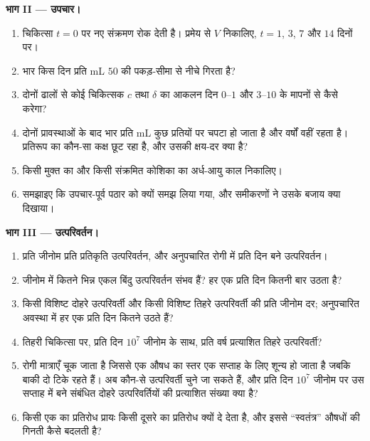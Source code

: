 \begin{problem}
\medskip
\noindent\textbf{भाग II --- उपचार।}
\begin{enumerate}[resume]
  \item चिकित्सा $t = 0$ पर नए संक्रमण रोक देती है। प्रमेय से $V$ निकालिए, $t =
        1$, $3$, $7$ और $14$ दिनों पर।
  \item भार किस दिन प्रति mL $50$ की पकड़-सीमा से नीचे गिरता है?
  \item दोनों ढालों से कोई चिकित्सक $c$ तथा $\delta$ का आकलन दिन $0$--$1$
        और $3$--$10$ के मापनों से कैसे करेगा?
  \item दोनों प्रावस्थाओं के बाद भार प्रति mL कुछ प्रतियों पर चपटा हो
        जाता है और वर्षों वहीं रहता है। प्रतिरूप का कौन-सा कक्ष छूट
        रहा है, और उसकी क्षय-दर क्या है?
  \item किसी मुक्त  का और किसी संक्रमित कोशिका का अर्ध-आयु
        काल निकालिए।
  \item समझाइए कि उपचार-पूर्व पठार को  क्यों समझ लिया गया, और
        समीकरणों ने उसके बजाय क्या दिखाया।
\end{enumerate}

\medskip
\noindent\textbf{भाग III --- उत्परिवर्तन।}
\begin{enumerate}[resume]
  \item प्रति जीनोम प्रति प्रतिकृति उत्परिवर्तन, और अनुपचारित रोगी में
        प्रति दिन बने उत्परिवर्तन।
  \item जीनोम में कितने भिन्न एकल बिंदु उत्परिवर्तन संभव हैं? हर एक
        प्रति दिन कितनी बार उठता है?
  \item किसी विशिष्ट दोहरे उत्परिवर्ती और किसी विशिष्ट तिहरे
        उत्परिवर्ती की प्रति जीनोम दर; अनुपचारित अवस्था में हर एक प्रति
        दिन कितने उठते हैं?
  \item तिहरी चिकित्सा पर, प्रति दिन $10^{7}$ जीनोम के साथ, प्रति वर्ष
        प्रत्याशित तिहरे उत्परिवर्ती?
  \item रोगी मात्राएँ चूक जाता है जिससे एक औषध का स्तर एक सप्ताह के लिए
        शून्य हो जाता है जबकि बाकी दो टिके रहते हैं। अब कौन-से
        उत्परिवर्ती चुने जा सकते हैं, और प्रति दिन $10^{7}$ जीनोम पर
        उस सप्ताह में बने संबंधित दोहरे उत्परिवर्तियों की प्रत्याशित
        संख्या क्या है?
  \item किसी एक  का प्रतिरोध प्रायः किसी दूसरे का
        प्रतिरोध क्यों दे देता है, और इससे ``स्वतंत्र'' औषधों की गिनती
        कैसे बदलती है?
\end{enumerate}


\end{problem}
